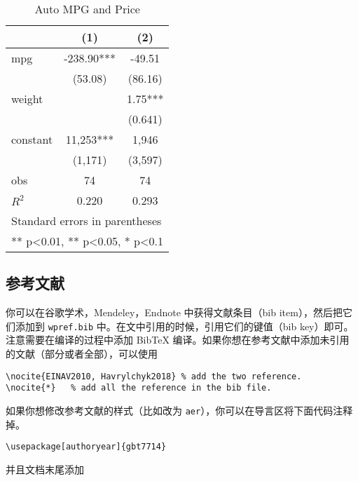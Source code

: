 \documentclass[lang=cn,11pt]{elegantpaper}
\begin{document}
\begin{table}[htbp]
  \small
  \centering
  \caption{Auto MPG and Price \label{tab:reg}}
    \begin{tabular}{lcc}
    \toprule
                    &       (1)         &        (2)      \\
    \midrule
    mpg             &    -238.90***     &      -49.51     \\
                    &     (53.08)       &      (86.16)    \\
    weight          &                   &      1.75***    \\
                    &                   &      (0.641)    \\
    constant        &     11,253***     &       1,946     \\
                    &     (1,171)       &      (3,597)   \\
    obs             &        74         &         74     \\
    $R^2$           &      0.220        &       0.293    \\
    \bottomrule
    \multicolumn{3}{l}{\scriptsize Standard errors in parentheses} \\
    \multicolumn{3}{l}{\scriptsize *** p<0.01, ** p<0.05, * p<0.1} \\
    \end{tabular}%
\end{table}%



\subsection{参考文献}
你可以在谷歌学术，Mendeley，Endnote 中获得文献条目（bib item），然后把它们添加到 \lstinline{wpref.bib} 中。在文中引用的时候，引用它们的键值（bib key）即可。注意需要在编译的过程中添加 Bib\TeX{} 编译。如果你想在参考文献中添加未引用的文献（部分或者全部），可以使用

\begin{lstlisting}
\nocite{EINAV2010, Havrylchyk2018} % add the two reference.
\nocite{*}   % add all the reference in the bib file.
\end{lstlisting}

如果你想修改参考文献的样式（比如改为 \lstinline{aer}），你可以在导言区将下面代码注释掉。
\begin{lstlisting}
\usepackage[authoryear]{gbt7714}
\end{lstlisting}

并且文档末尾添加
\end{document}
